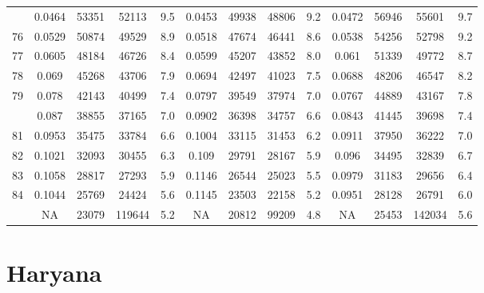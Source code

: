\documentclass[
  14pt,
]{article}
\begin{document}
\begin{longtable}[t]{lcccccccccccc}
\addlinespace
75 & 0.0464 & 53351 & 52113 & 9.5 & 0.0453 & 49938 & 48806 & 9.2 & 0.0472 & 56946 & 55601 & 9.7\\
76 & 0.0529 & 50874 & 49529 & 8.9 & 0.0518 & 47674 & 46441 & 8.6 & 0.0538 & 54256 & 52798 & 9.2\\
77 & 0.0605 & 48184 & 46726 & 8.4 & 0.0599 & 45207 & 43852 & 8.0 & 0.061 & 51339 & 49772 & 8.7\\
78 & 0.069 & 45268 & 43706 & 7.9 & 0.0694 & 42497 & 41023 & 7.5 & 0.0688 & 48206 & 46547 & 8.2\\
79 & 0.078 & 42143 & 40499 & 7.4 & 0.0797 & 39549 & 37974 & 7.0 & 0.0767 & 44889 & 43167 & 7.8\\
\addlinespace
80 & 0.087 & 38855 & 37165 & 7.0 & 0.0902 & 36398 & 34757 & 6.6 & 0.0843 & 41445 & 39698 & 7.4\\
81 & 0.0953 & 35475 & 33784 & 6.6 & 0.1004 & 33115 & 31453 & 6.2 & 0.0911 & 37950 & 36222 & 7.0\\
82 & 0.1021 & 32093 & 30455 & 6.3 & 0.109 & 29791 & 28167 & 5.9 & 0.096 & 34495 & 32839 & 6.7\\
83 & 0.1058 & 28817 & 27293 & 5.9 & 0.1146 & 26544 & 25023 & 5.5 & 0.0979 & 31183 & 29656 & 6.4\\
84 & 0.1044 & 25769 & 24424 & 5.6 & 0.1145 & 23503 & 22158 & 5.2 & 0.0951 & 28128 & 26791 & 6.0\\
\addlinespace
85 & NA & 23079 & 119644 & 5.2 & NA & 20812 & 99209 & 4.8 & NA & 25453 & 142034 & 5.6\\*
\end{longtable}

\pagebreak

\hypertarget{haryana}{%
\section{Haryana}\label{haryana}}
\end{document}
